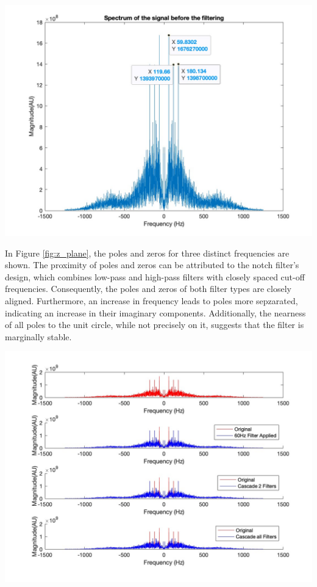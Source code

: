 \documentclass[8pt]{article}  %
\theoremstyle{plain}
\theoremstyle{definition}
\theoremstyle{remark}
\begin{document}
    \hfill
    \begin{minipage}{0.49\textwidth}
        \includegraphics[width=\linewidth]{figure/figure_8.jpg}
        \label{fig:peaks}

        \vspace{0.3cm}

        In Figure \ref{fig:z_plane}, the poles and zeros for three distinct frequencies are shown. 
        The proximity of poles and zeros can be attributed to the notch filter's design, 
        which combines low-pass and high-pass filters with closely spaced cut-off frequencies.
         Consequently, the poles and zeros of both filter types are closely aligned. 
         Furthermore, an increase in frequency leads to poles more sepzarated, 
         indicating an increase in their imaginary components. 
         Additionally, the nearness of all poles to the unit circle, 
         while not precisely on it, suggests that the filter is marginally stable.

         \includegraphics[width=\linewidth]{figure/figure_10.jpg}
         \label{fig:cascade} 
    \end{minipage}



    
\end{document}
